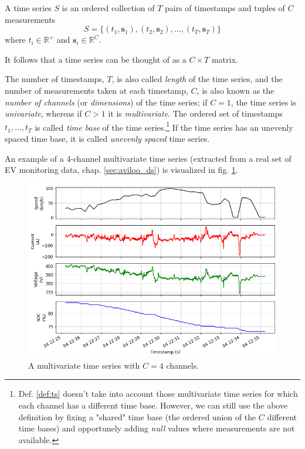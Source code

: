 \begin{definition}
\label{def:ts}
A time series $S$ is an ordered collection of $T$ pairs of timestamps and tuples of $C$ measurements
\[
S=\{(t_1,\mathbf{s}_1),(t_2,\mathbf{s}_2),\dots,(t_T,\mathbf{s}_T)\}
\]
where $t_i \in \mathbb{R}^+$ and $\mathbf{s}_i \in \mathbb{R}^C$.
\end{definition}
It follows that a time series can be thought of as a $C\times T$ matrix.

The number of timestamps, $T$, is also called \textit{length} of the time series, and the number of measurements taken at each timestamp, $C$, is also known as the \textit{number of channels} (or \textit{dimensions}) of the time series; if $C=1$, the time series is \textit{univariate}, whereas if $C>1$ it is \textit{multivariate}. The ordered set of timestamps $t_1,\dots,t_T$ is called \textit{time base} of the time series.\footnote{Def. \ref{def:ts} doesn't take into account those multivariate time series for which each channel has a different time base. However, we can still use the above definition by fixing a "shared" time base (the ordered union of the $C$ different time bases) and opportunely adding \textit{null} values where measurements are not available.} If the time series has an unevenly spaced time base, it is called \textit{unevenly spaced} time series.

An example of a 4-channel multivariate time series (extracted from a real set of EV monitoring data, chap. \ref{sec:aviloo_ds}) is visualized in fig. \ref{fig:ts_example}.

\begin{figure}[hbt!]
    \centering
    \includegraphics[width=\textwidth]{images/ts_example}
    \caption[A multivariate time series with 4 channels]{A multivariate time series with $C=4$ channels.}
    \label{fig:ts_example}
\end{figure}


